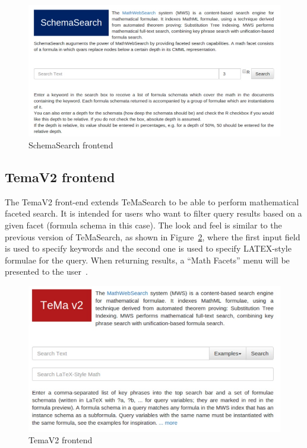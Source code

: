 \documentclass{deliverablereport}
\begin{document}
\begin{figure}[h]
\centering
 \includegraphics[scale=0.9]{figure5.jpg}
 \caption{SchemaSearch frontend}
 \label{fig:schema_search}
\end{figure}



\subsection{TemaV2 frontend}\label{v2}

The TemaV2 front-end extends TeMaSearch to be able to perform mathematical faceted
search. It is intended for users who want to filter query results based on a given facet
(formula schema in this case). The look and feel is similar to the previous version of
TeMaSearch, as shown in Figure~\ref{fig:temav2}, where the first input field is used to
specify keywords and the second one is used to specify LATEX-style formulae for the
query. When returning results, a “Math Facets” menu will be presented to the
user~\cite{Ham:bcs15}.

\begin{figure}[H]
\centering
 \includegraphics[scale=0.8]{figure6.jpg}
 \caption{TemaV2 frontend}
 \label{fig:temav2}
\end{figure}
\end{document}

